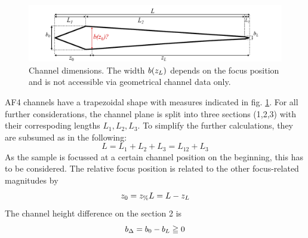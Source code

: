 \begin{figure}[H]  
  \begin{center}
    \includegraphics[width=\linewidth]{./images/fffChannelMeasures.pdf}    
  \end{center}
  \caption[Channel dimensions]{Channel dimensions. The width $b(z_L)$ depends on the focus position and is not 
  accessible via geometrical channel data only.}
  \label{fig:fffChannelMeasures} 
\end{figure}AF4 channels have a trapezoidal shape with measures indicated in fig. \ref{fig:fffChannelMeasures}.
For all further considerations, the channel plane is split into three sections (1,2,3) with their correspoding lengths $L_1, L_2, L_3$. To simplify the further calculations, they are subsumed as in the following:
\begin{equation}
  L
  = L_1 + L_2 + L_3 = L_{12} + L_3   
\end{equation}
As the sample is focussed at a certain channel position on the beginning, this has to be considered. The relative focus position \zP is related to the other focus-related magnitudes by
\begin{equation}
  z_0 = z_\text{\%} L = L - z_L
\end{equation}
The channel height difference \bDelta on the section 2 is
\begin{equation}
  b_\Delta = b_0 - b_L \geqq 0
\end{equation}

